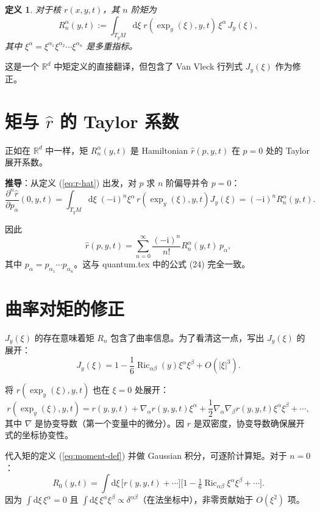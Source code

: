 \documentclass{book}
\newcommand{\assign}{:=}
\newcommand{\mathd}{\mathrm{d}}
\newcommand{\mathi}{\mathrm{i}}
\newtheorem{definition}{定义}[chapter]
\begin{document}
\begin{definition}
  对于核 $r(x,y,t)$，其 $n$ 阶矩为
  \begin{equation}
    R_n^\alpha(y,t) \assign \int_{T_yM} \mathd\xi \; r(\exp_y(\xi), y, t) \, \xi^\alpha \, J_y(\xi), \label{eq:moment-def}
  \end{equation}
  其中 $\xi^\alpha = \xi^{\alpha_1} \xi^{\alpha_2} \cdots \xi^{\alpha_n}$ 是多重指标。
\end{definition}

这是一个 $\mathbb{R}^d$ 中矩定义的直接翻译，但包含了 Van Vleck 行列式 $J_y(\xi)$ 作为修正。

\section{矩与 $\hat{r}$ 的 Taylor 系数}

正如在 $\mathbb{R}^d$ 中一样，矩 $R_n^\alpha(y,t)$ 是 Hamiltonian $\hat{r}(p,y,t)$ 在 $p=0$ 处的 Taylor 展开系数。

\textbf{推导}：从定义 (\ref{eq:r-hat}) 出发，对 $p$ 求 $n$ 阶偏导并令 $p=0$：
\[
\frac{\partial^n \hat{r}}{\partial p_\alpha}(0,y,t) = \int_{T_yM} \mathd\xi \; (-\mathi)^n \xi^\alpha \, r(\exp_y(\xi), y, t) J_y(\xi) = (-\mathi)^n R_n^\alpha(y,t).
\]

因此
\begin{equation}
  \hat{r}(p,y,t) = \sum_{n=0}^\infty \frac{(-\mathi)^n}{n!} R_n^\alpha(y,t) \, p_\alpha, \label{eq:r-taylor}
\end{equation}
其中 $p_\alpha = p_{\alpha_1} \cdots p_{\alpha_n}$。这与 quantum.tex 中的公式 (24) 完全一致。

\section{曲率对矩的修正}

$J_y(\xi)$ 的存在意味着矩 $R_n$ 包含了曲率信息。为了看清这一点，写出 $J_y(\xi)$ 的展开：
\[
J_y(\xi) = 1 - \frac{1}{6} \operatorname{Ric}_{\alpha\beta}(y) \xi^\alpha \xi^\beta + O(|\xi|^3).
\]

将 $r(\exp_y(\xi), y, t)$ 也在 $\xi=0$ 处展开：
\[
r(\exp_y(\xi), y, t) = r(y,y,t) + \nabla_\alpha r(y,y,t) \xi^\alpha + \frac{1}{2} \nabla_\alpha \nabla_\beta r(y,y,t) \xi^\alpha \xi^\beta + \cdots,
\]
其中 $\nabla$ 是协变导数（第一个变量中的微分）。因 $r$ 是双密度，协变导数确保展开式的坐标协变性。

代入矩的定义 (\ref{eq:moment-def}) 并做 Gaussian 积分，可逐阶计算矩。对于 $n=0$：
\[
R_0(y,t) = \int \mathd\xi \, \bigl[ r(y,y,t) + \cdots \bigr] \bigl[ 1 - \tfrac16 \operatorname{Ric}_{\alpha\beta} \xi^\alpha \xi^\beta + \cdots \bigr].
\]
因为 $\int \mathd\xi \, \xi^\alpha = 0$ 且 $\int \mathd\xi \, \xi^\alpha \xi^\beta \propto \delta^{\alpha\beta}$（在法坐标中），非零贡献始于 $O(\xi^2)$ 项。
\end{document}

